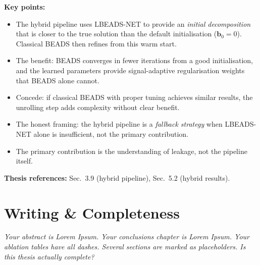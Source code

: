 \documentclass[11pt, letterpaper]{article}
\newcounter{qcounter}
\newcommand{\question}[1]{%
  \stepcounter{qcounter}%
  \begin{questionbox}[Q\theqcounter]%
    \itshape #1%
  \end{questionbox}%
}
\begin{document}
\begin{answerbox}
\textbf{Key points:}
\begin{itemize}[nosep]
  \item The hybrid pipeline uses LBEADS-NET to provide an
        \emph{initial decomposition} that is closer to the true
        solution than the default initialisation ($\mathbf{b}_0 = 0$).
        Classical BEADS then refines from this warm start.
  \item The benefit: BEADS converges in fewer iterations from a
        good initialisation, and the learned parameters provide
        signal-adaptive regularisation weights that BEADS alone
        cannot.
  \item Concede: if classical BEADS with proper tuning achieves
        similar results, the unrolling step adds complexity without
        clear benefit.
  \item The honest framing: the hybrid pipeline is a
        \emph{fallback strategy} when LBEADS-NET alone is insufficient,
        not the primary contribution.
  \item The primary contribution is the understanding of leakage,
        not the pipeline itself.
\end{itemize}
\textbf{Thesis references:} Sec.~3.9 (hybrid pipeline), Sec.~5.2 (hybrid results).
\end{answerbox}


\section{Writing \& Completeness}

\question{Your abstract is Lorem Ipsum.  Your conclusions chapter is Lorem
Ipsum.  Your ablation tables have all dashes.  Several sections are
marked as placeholders.  Is this thesis actually complete?}
\end{document}

